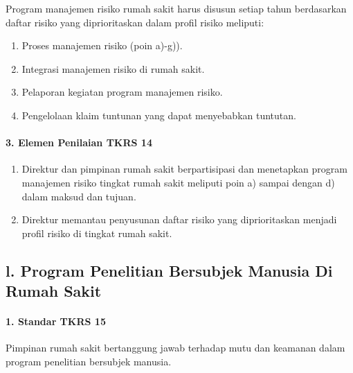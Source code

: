 \documentclass[
]{book}
\providecommand{\tightlist}{%
  \setlength{\itemsep}{0pt}\setlength{\parskip}{0pt}}
\begin{document}
Program manajemen risiko rumah sakit harus disusun setiap tahun berdasarkan daftar risiko yang diprioritaskan dalam profil risiko meliputi:

\begin{enumerate}
\def\labelenumi{\alph{enumi}.}
\tightlist
\item
  Proses manajemen risiko (poin a)-g)).
\item
  Integrasi manajemen risiko di rumah sakit.
\item
  Pelaporan kegiatan program manajemen risiko.
\item
  Pengelolaan klaim tuntunan yang dapat menyebabkan tuntutan.
\end{enumerate}

\hypertarget{elemen-penilaian-tkrs-14}{%
\paragraph*{3. Elemen Penilaian TKRS 14}\label{elemen-penilaian-tkrs-14}}

\begin{enumerate}
\def\labelenumi{\alph{enumi}.}
\tightlist
\item
  Direktur dan pimpinan rumah sakit berpartisipasi dan menetapkan program manajemen risiko tingkat rumah sakit meliputi poin a) sampai dengan d) dalam maksud dan tujuan.
\item
  Direktur memantau penyusunan daftar risiko yang diprioritaskan menjadi profil risiko di tingkat rumah sakit.
\end{enumerate}

\hypertarget{l.-program-penelitian-bersubjek-manusia-di-rumah-sakit}{%
\subsection*{l. Program Penelitian Bersubjek Manusia Di Rumah Sakit}\label{l.-program-penelitian-bersubjek-manusia-di-rumah-sakit}}

\hypertarget{standar-tkrs-15}{%
\paragraph*{1. Standar TKRS 15}\label{standar-tkrs-15}}

Pimpinan rumah sakit bertanggung jawab terhadap mutu dan keamanan dalam program penelitian bersubjek manusia.
\end{document}
